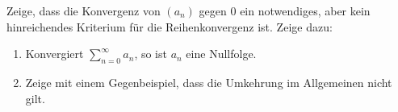 \begin{exercise}
  \label{ex:convergent-series-zero-sequence}
  Zeige, dass die Konvergenz von $(a_n)$ gegen $0$ ein notwendiges, aber kein
  hinreichendes Kriterium für die Reihenkonvergenz ist. Zeige dazu:
  \begin{enumerate}
  \item Konvergiert $\sum_{n=0}^\infty a_n$, so ist $a_n$ eine Nullfolge.
  \item Zeige mit einem Gegenbeispiel, dass die Umkehrung im Allgemeinen nicht
    gilt.
  \end{enumerate}
\end{exercise}
